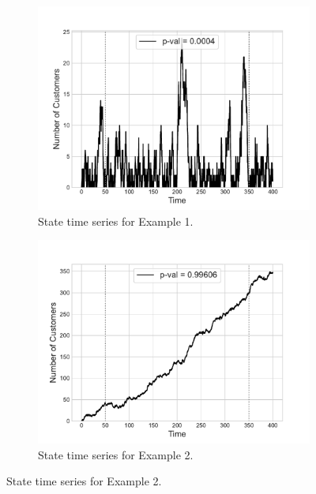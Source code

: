 \documentclass{article}
\begin{document}
\begin{figure}[!htbp]
  \begin{center}
  \begin{subfigure}[b]{0.45\textwidth}
    \includegraphics[width=\textwidth]{img/adf_test_steadystate.pdf}
    \caption{State time series for Example 1.}
    \label{fig:timeseries1}
  \end{subfigure}
  \begin{subfigure}[b]{0.45\textwidth}
    \includegraphics[width=\textwidth]{img/adf_test_not_steadystate.pdf}
    \caption{State time series for Example 2.}
    \label{fig:timeseries2}
  \end{subfigure}
  \end{center}
\end{figure}
\end{document}
